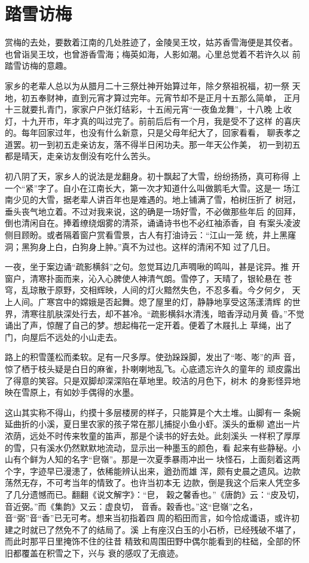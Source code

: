 \chapter{踏雪访梅}

赏梅的去处，要数着江南的几处胜迹了，金陵吴王坟，姑苏香雪海便是其佼者。
也曾诣吴王坟，也曾游香雪海；梅英如海，人影如潮。心里总觉着不若许久以
前踏雪访梅的意趣。

家乡的老辈人总以为从腊月二十三祭灶神开始算过年，除夕祭祖祝福，初一祭
天地，初五奉财神，直到元宵才算过完年。元宵节却不是正月十五那么简单，
正月十三就要扎青门，家家户户张灯结彩，十五闹元宵“一夜鱼龙舞”，十八晚
上收灯，十九开市，年才真的叫过完了。前前后后有一个月，我是受不了这样
的喜庆的。每年回家过年，也没有什么新意，只是父母年纪大了，回家看看，
聊表孝之道罢。初一到初五走亲访友，落不得半日闲功夫。那一年天公作美，
初一到初五都是晴天，走亲访友倒没有吃什么苦头。

初八阴了天，家乡人的说法是龙翻身。初十飘起了大雪，纷纷扬扬，真可称得
上一个“紧”字了。自小在江南长大，第一次才知道什么叫做鹅毛大雪。这是一
场江南少见的大雪，据老辈人讲百年也是难遇的。地上铺满了雪，柏树压折了
树冠，垂头丧气地立着。不过对我来说，这的确是一场好雪，不必做那些年后
的回拜，倒也清闲自在。捧着缭绕烟雾的清茶，诵诵诗书也不必红袖添香，自
有案头凌波侧目顾盼。或者隔着窗户赏看雪景，古人有打油诗云：“江山一笼
统，井上黑窿洞；黑狗身上白，白狗身上肿。”真不为过也。这样的清闲不知
过了几日。

一夜，坐于案边诵“疏影横斜”之句。忽觉耳边几声啁啾的鸣叫，甚是诧异。推
开窗户，清寒扑面而来，沁入心脾使人神清气朗。雪停了，天晴了，银轮悬在
苍穹，乱琼散于原野，交相辉映，人间的灯火黯然失色，不忍多看。今夕何夕，
天上人间。广寒宫中的嫦娥是否起舞。熄了屋里的灯，静静地享受这荡漾清辉
的世界，清寒往肌肤深处行去，却不甚冷。“疏影横斜水清浅，暗香浮动月黄
昏。”不觉诵出了声，惊醒了自己的梦。想起梅花一定开着。便着了木屐扎上
草绳，出了门，向屋后不远处的小山走去。

路上的积雪蓬松而柔软。足有一尺多厚。使劲跺跺脚，发出了“嘭、嘭”的声
音，惊了栖于枝头疑是白日的麻雀，扑喇喇地乱飞。心底遗忘许久的童年的
顽皮露出了得意的笑容。只是双脚却深深陷在草地里。皎洁的月色下，树木
的身影怪异地映在雪原上，有如妙手偶得的水墨。

这山其实称不得山，约摸十多层楼房的样子，只能算是个大土堆。山脚有一
条婉延曲折的小溪，夏日里农家的孩子常在那儿捕捉小鱼小虾。溪头的垂柳
遮出一片浓荫，远处不时传来牧童的笛声，那是个读书的好去处。此刻溪头
一样积了厚厚的雪，只有溪水仍然默默地流动，显示出一种墨玉的颜色，看
起来有些静秘。小山有个鲜为人知的名字“皀嶺”。那是一次夏季暴雨冲出一
块怪石，上面刻着这两个字，字迹早已漫漶了，依稀能辨认出来，遒劲而雄
浑，颇有史晨之遗风。边款荡然无存，不可考当年的情致了。也许当初本无
边款，倒是我这个后来人凭空多了几分遗憾而已。翻翻《说文解字》：“皀，
穀之馨香也。”《唐韵》云：“皮及切，音近弼。”而《集韵》又云：虚良切，
音香。穀香也。”这“皀嶺”之名，音“弼”音“香”已无可考。想来当初指着四
周的稻田而言，如今恰成谶语，或许初建之时就已了然免不了的结局了。溪
上有座汉白玉的小石桥，已经残破不堪了，而此时那平日里掩饰不住的往昔
精致和周围田野中偶尔能看到的柱础，全部的怀旧都覆盖在积雪之下，兴与
衰的感叹了无痕迹。

